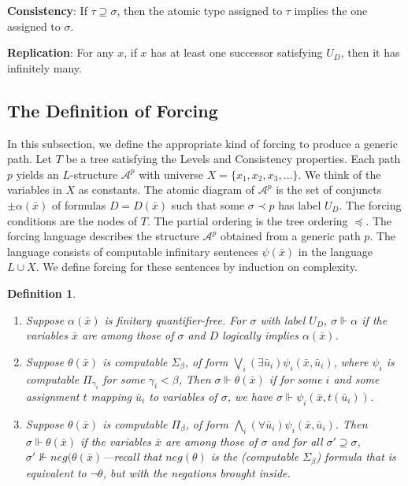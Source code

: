\documentclass{article}
\newtheorem{defn}{Definition}
\begin{document}
\bigskip
\noindent
\textbf{Consistency}:  If $\tau\supseteq\sigma$, then the atomic type assigned to $\tau$ implies the one assigned to $\sigma$.

\bigskip
\noindent
\textbf{Replication}:  For any $x$, if $x$ has at least one successor satisfying $U_D$, then it has infinitely many.    

\subsection{The Definition of Forcing}

In this subsection, we define the appropriate kind of forcing to produce a generic path.  Let $T$ be a tree satisfying the Levels and Consistency properties.  Each path $p$ yields an $L$-structure $\mathcal{A}^p$ with universe $X = \{x_1,x_2,x_3,\ldots\}$.  We think of the variables in $X$ as constants.  The atomic diagram of $\mathcal{A}^p$ is the set of conjuncts $\pm\alpha(\bar{x})$ of formulas $D = D(\bar{x})$ such that some $\sigma\prec p$ has label $U_D$.  The forcing conditions are the nodes of $T$.  The partial ordering is the tree ordering $\preceq$.   The forcing language describes the structure $\mathcal{A}^p$ obtained from a generic path $p$.  The language consists of computable infinitary sentences $\psi(\bar{x})$ in the language $L\cup X$.  We define forcing for these sentences by induction on complexity.    

\begin{defn}\

\begin{enumerate}

\item  Suppose $\alpha(\bar{x})$ is finitary quantifier-free.  For $\sigma$ with label $U_D$, $\sigma\Vdash\alpha$ if the variables $\bar{x}$ are among those of $\sigma$ and $D$ logically implies $\alpha(\bar{x})$.  

\item  Suppose $\theta(\bar{x})$ is computable $\Sigma_\beta$, of form $\bigvee_i(\exists\bar{u}_i)\psi_i(\bar{x},\bar{u}_i)$, where $\psi_i$ is computable $\Pi_{\gamma_i}$ for some $\gamma_i < \beta$, Then $\sigma\Vdash\theta(\bar{x})$ if for some $i$ and some assignment $t$ mapping 
$\bar{u}_i$ to variables of $\sigma$, we have $\sigma\Vdash\psi_i(\bar{x},t(\bar{u}_i))$.

\item  Suppose $\theta(\bar{x})$ is computable $\Pi_\beta$, of form $\bigwedge_i(\forall\bar{u}_i)\psi_i(\bar{x},\bar{u}_i)$.  Then $\sigma\Vdash\theta(\bar{x})$ if the variables $\bar{x}$ are among those of $\sigma$ and for all $\sigma'\supseteq\sigma$, $\sigma'\not\Vdash neg(\theta(\bar{x})$---recall that $neg(\theta)$ is the (computable $\Sigma_\beta$) formula that is equivalent to $\neg{\theta}$, but with the negations brought inside.    

\end{enumerate}

\end{defn}   
\end{document}
